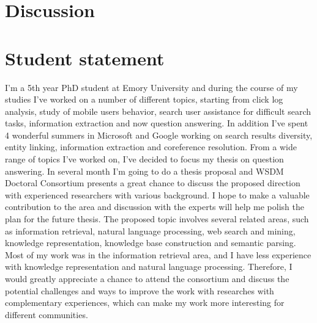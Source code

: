 \documentclass{sig-alternate}
\begin{document}
\section{Discussion}


%

%
%
\newpage

\appendix
\section{Student statement}
I'm a 5th year PhD student at Emory University and during the course of my studies I've worked on a number of different topics, starting from click log analysis, study of mobile users behavior, search user assistance for difficult search tasks, information extraction and now question answering.
In addition I've spent 4 wonderful summers in Microsoft and Google working on search results diversity, entity linking, information extraction and coreference resolution.
From a wide range of topics I've worked on, I've decided to focus my thesis on question answering.
In several month I'm going to do a thesis proposal and WSDM Doctoral Consortium presents a great chance to discuss the proposed direction with experienced researchers with various background.
I hope to make a valuable contribution to the area and discussion with the experts will help me polish the plan for the future thesis.
The proposed topic involves several related areas, such as information retrieval, natural language processing, web search and mining, knowledge representation, knowledge base construction and semantic parsing.
Most of my work was in the information retrieval area, and I have less experience with knowledge representation and natural language processing.
Therefore, I would greatly appreciate a chance to attend the consortium and discuss the potential challenges and ways to improve the work with researches with complementary experiences, which can make my work more interesting for different communities.
\end{document}
